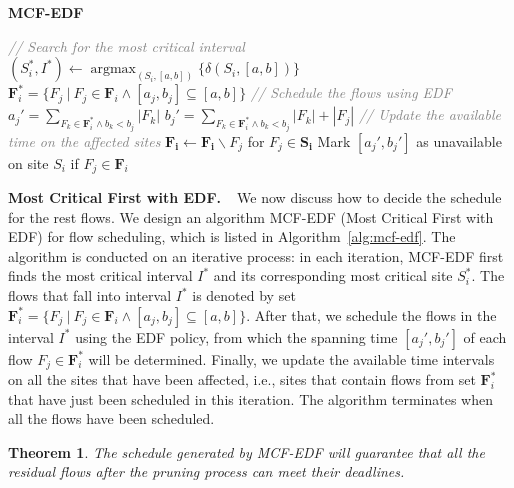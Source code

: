 \documentclass{article}
\DeclareMathOperator*{\argmax}{argmax}
\newtheorem{theorem}{Theorem}
\newcommand{\bpara}[2]{\noindent\textbf{#1~~}{#2}}
\begin{document}
\begin{algorithm}[!t]
\caption{\label{alg:mcf-edf} \textbf{MCF-EDF}}


\begin{algorithmic}[1]
	\STATE \emph{\textcolor{gray}{// Search for the most critical interval}}
	\STATE $(S_i^*, I^*) \leftarrow \argmax_{(S_i, [a, b])}{\{\delta(S_i, [a, b])\}}$
	\STATE $\mathbf{F}_i^* = \{ F_j~|~F_j \in \mathbf{F}_i \wedge [a_j, b_j] \subseteq [a, b] \}$
	\STATE \emph{\textcolor{gray}{// Schedule the flows using EDF}}
		\STATE $a_j' = \sum_{F_k \in \mathbf{F}_i^* \wedge b_k < b_j}|F_k|$
		\STATE $b_j' = \sum_{F_k \in \mathbf{F}_i^* \wedge b_k < b_j}|F_k| + |F_j|$
	\ENDFOR
	\STATE \emph{\textcolor{gray}{// Update the available time on the affected sites}}
		\STATE $\mathbf{F_i} \leftarrow \mathbf{F_i} \backslash F_j$ for $F_j \in \mathbf{S_i}$
		\STATE Mark $[a_j', b_j']$ as unavailable on site $S_i$ if $F_j \in \mathbf{F}_i$
	\ENDFOR
\ENDWHILE
\end{algorithmic}
\end{algorithm}

\bpara{Most Critical First with EDF.}We now discuss how to decide the schedule for the rest flows. We design an algorithm MCF-EDF (Most Critical First with EDF) for flow scheduling, which is listed in Algorithm~\ref{alg:mcf-edf}. The algorithm is conducted on an iterative process: in each iteration, MCF-EDF first finds the most critical interval $I^*$ and its corresponding most critical site $S_i^*$. The flows that fall into interval $I^*$ is denoted by set $\mathbf{F}_i^* = \{ F_j~|~F_j \in \mathbf{F}_i \wedge [a_j, b_j] \subseteq [a, b] \}$. After that, we schedule the flows in the interval $I^*$ using the EDF policy, from which the spanning time $[a_j', b_j']$ of each flow $F_j \in \mathbf{F}_i^*$ will be determined. Finally, we update the available time intervals on all the sites that have been affected, i.e., sites that contain flows from set $\mathbf{F}_i^*$ that have just been scheduled in this iteration. The algorithm terminates when all the flows have been scheduled.

\begin{theorem}
The schedule generated by MCF-EDF will guarantee that all the residual flows after the pruning process can meet their deadlines.
\end{theorem}
\end{document}
